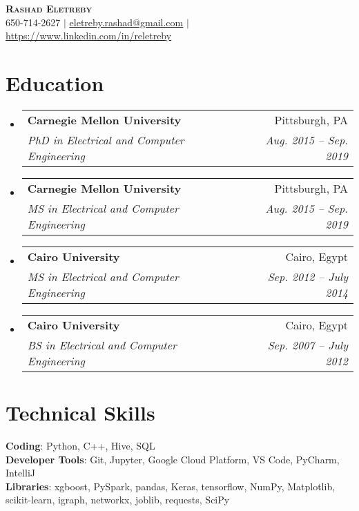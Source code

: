 \documentclass[letterpaper,11pt]{article}
\makeatletter
\newcommand{\resumeSubheading}[4]{
  \vspace{-2pt}\item
    \begin{tabular*}{0.97\textwidth}[t]{l@{\extracolsep{\fill}}r}
      \textbf{#1} & #2 \\
      \textit{\small#3} & \textit{\small #4} \\
    \end{tabular*}\vspace{-7pt}
}
\newcommand{\resumeSubHeadingListStart}{\begin{itemize}[leftmargin=0.15in, label={}]}
\newcommand{\resumeSubHeadingListEnd}{\end{itemize}}
\makeatother
\begin{document}

\begin{center}
    \textbf{\Huge \scshape Rashad Eletreby} \\ \vspace{1pt}
    \small 650-714-2627 $|$ \href{mailto:eletreby.rashad@gmail.com}{\underline{eletreby.rashad@gmail.com}} $|$ 
    \href{https://www.linkedin.com/in/reletreby}{\underline{https://www.linkedin.com/in/reletreby}} 
    \\ \vspace{1mm}
\end{center}


\section{Education}
  \resumeSubHeadingListStart
    \resumeSubheading
      {Carnegie Mellon University}{Pittsburgh, PA}
      {PhD in Electrical and Computer Engineering}{Aug. 2015 -- Sep. 2019}
      
     \vspace{1mm}
    \resumeSubheading
      {Carnegie Mellon University}{Pittsburgh, PA}
      {MS in Electrical and Computer Engineering}{Aug. 2015 -- Sep. 2019}
      
       \vspace{1mm}
    \resumeSubheading
      {Cairo University}{Cairo, Egypt}
      {MS in Electrical and Computer Engineering}{Sep. 2012 -- July 2014}
      
      \vspace{1mm}
    \resumeSubheading
      {Cairo University}{Cairo, Egypt}
      {BS in Electrical and Computer Engineering}{Sep. 2007 -- July 2012}
  \resumeSubHeadingListEnd


\vspace{1mm}
\section{Technical Skills}
 \begin{itemize}[leftmargin=0.15in, label={}]
    \small{\item{
     \textbf{Coding}{: Python, C++, Hive, SQL} \\
     \textbf{Developer Tools}{: Git, Jupyter, Google Cloud Platform, VS Code, PyCharm, IntelliJ} \\
     \textbf{Libraries}{: xgboost, PySpark, pandas, Keras, tensorflow, NumPy, Matplotlib, scikit-learn, igraph, networkx, joblib, requests, SciPy}
    }}
 \end{itemize}
 
\end{document}
